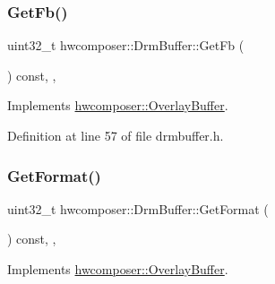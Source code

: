\mbox{\label{classhwcomposer_1_1DrmBuffer_accd7dc14e04bd76beca146fc3d265f81}} 
\subsubsection{\texorpdfstring{Get\+Fb()}{GetFb()}}
{\footnotesize\ttfamily uint32\+\_\+t hwcomposer\+::\+Drm\+Buffer\+::\+Get\+Fb (\begin{DoxyParamCaption}{ }\end{DoxyParamCaption}) const\hspace{0.3cm}{\ttfamily [inline]}, {\ttfamily [override]}, {\ttfamily [virtual]}}



Implements \mbox{\hyperlink{classhwcomposer_1_1OverlayBuffer_a9860269bb8712eee5c7c4ca1c8846e9a}{hwcomposer\+::\+Overlay\+Buffer}}.



Definition at line 57 of file drmbuffer.\+h.


\begin{DoxyCode}{0}
\end{DoxyCode}
\mbox{\label{classhwcomposer_1_1DrmBuffer_a35eecd412bab8ea5822ec7a81c2fc34a}} 
\subsubsection{\texorpdfstring{Get\+Format()}{GetFormat()}}
{\footnotesize\ttfamily uint32\+\_\+t hwcomposer\+::\+Drm\+Buffer\+::\+Get\+Format (\begin{DoxyParamCaption}{ }\end{DoxyParamCaption}) const\hspace{0.3cm}{\ttfamily [inline]}, {\ttfamily [override]}, {\ttfamily [virtual]}}



Implements \mbox{\hyperlink{classhwcomposer_1_1OverlayBuffer_af12a31161149b0f89e92e5dfc18732c5}{hwcomposer\+::\+Overlay\+Buffer}}.



